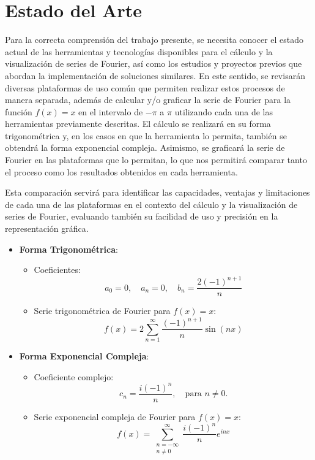 \chapter{Estado del Arte}\label{ch:Estado del Arte}
Para la correcta comprensión del trabajo presente, se necesita conocer el estado actual de las herramientas y tecnologías disponibles para el cálculo y la visualización de series de Fourier, así como los estudios y proyectos previos que abordan la implementación de soluciones similares. En este sentido, se revisarán diversas plataformas de uso común que permiten realizar estos procesos de manera separada, además de calcular y/o graficar la serie de Fourier para la función \( f(x) = x \) en el intervalo de \(-\pi\) a \(\pi\) utilizando cada una de las herramientas previamente descritas. El cálculo se realizará en su forma trigonométrica y, en los casos en que la herramienta lo permita, también se obtendrá la forma exponencial compleja. Asimismo, se graficará la serie de Fourier en las plataformas que lo permitan, lo que nos permitirá comparar tanto el proceso como los resultados obtenidos en cada herramienta. \newline

Esta comparación servirá para identificar las capacidades, ventajas y limitaciones de cada una de las plataformas en el contexto del cálculo y la visualización de series de Fourier, evaluando también su facilidad de uso y precisión en la representación gráfica.\newline
\begin{itemize}
	\item \textbf{Forma Trigonométrica}:
	\begin{itemize}
		\item Coeficientes:
		\[
		a_0 = 0, \quad a_n = 0, \quad b_n = \frac{2 (-1)^{n+1}}{n}
		\]
		\item Serie trigonométrica de Fourier para \( f(x) = x \):
		\[
		f(x) = 2 \sum_{n=1}^{\infty} \frac{(-1)^{n+1}}{n} \sin(n x)
		\]
	\end{itemize}
	\item \textbf{Forma Exponencial Compleja}:
	\begin{itemize}
		\item Coeficiente complejo:
		\[
		c_n = \frac{i (-1)^n}{n}, \quad \text{para } n \neq 0.
		\]
		\item Serie exponencial compleja de Fourier para \( f(x) = x \):
		\[
		f(x) = \sum_{\substack{n=-\infty \\ n \neq 0}}^{\infty} \frac{i (-1)^n}{n} e^{i n x}
		\]
	\end{itemize}
\end{itemize}

